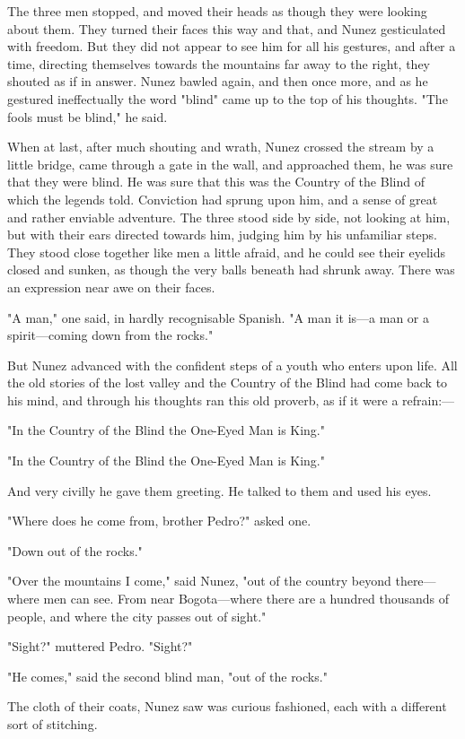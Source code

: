 \documentclass[submission]{sffms}
\begin{document}
The three men stopped, and moved their heads as though they were
looking about them. They turned their faces this way and that, and
Nunez gesticulated with freedom. But they did not appear to see him
for all his gestures, and after a time, directing themselves towards
the mountains far away to the right, they shouted as if in
answer. Nunez bawled again, and then once more, and as he gestured
ineffectually the word "blind" came up to the top of his
thoughts. "The fools must be blind," he said.

When at last, after much shouting and wrath, Nunez crossed the stream
by a little bridge, came through a gate in the wall, and approached
them, he was sure that they were blind. He was sure that this was the
Country of the Blind of which the legends told. Conviction had sprung
upon him, and a sense of great and rather enviable adventure. The
three stood side by side, not looking at him, but with their ears
directed towards him, judging him by his unfamiliar steps. They stood
close together like men a little afraid, and he could see their
eyelids closed and sunken, as though the very balls beneath had shrunk
away. There was an expression near awe on their faces.

"A man," one said, in hardly recognisable Spanish. "A man it is---a man
or a spirit---coming down from the rocks."

But Nunez advanced with the confident steps of a youth who enters upon
life. All the old stories of the lost valley and the Country of the
Blind had come back to his mind, and through his thoughts ran this old
proverb, as if it were a refrain:---

"In the Country of the Blind the One-Eyed Man is King."

"In the Country of the Blind the One-Eyed Man is King."

And very civilly he gave them greeting. He talked to them and used his
eyes.

"Where does he come from, brother Pedro?" asked one.

"Down out of the rocks."

"Over the mountains I come," said Nunez, "out of the country beyond
there---where men can see. From near Bogota---where there are a hundred
thousands of people, and where the city passes out of sight."

"Sight?" muttered Pedro. "Sight?"

"He comes," said the second blind man, "out of the rocks."

The cloth of their coats, Nunez saw was curious fashioned, each with a
different sort of stitching.
\end{document}
